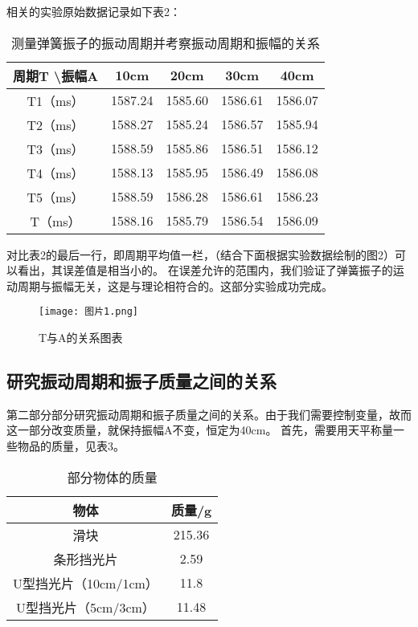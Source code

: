 \documentclass[11pt]{article}
\begin{document}
相关的实验原始数据记录如下表2：

\begin{table}[htbp]
    \centering
    \begin{tabular}{|c|c|c|c|c|}
    \hline
    周期T \textbackslash 振幅A & 10cm    & 20cm    & 30cm    & 40cm    \\ \hline
    T1（ms）                 & 1587.24 & 1585.60 & 1586.61 & 1586.07 \\ \hline
    T2（ms）                 & 1588.27 & 1585.24 & 1586.57 & 1585.94 \\ \hline
    T3（ms）                 & 1588.59 & 1585.86 & 1586.51 & 1586.12 \\ \hline
    T4（ms）                 & 1588.13 & 1585.95 & 1586.49 & 1586.08 \\ \hline
    T5（ms）                 & 1588.59 & 1586.28 & 1586.61 & 1586.23 \\ \hline
    T（ms）                  & 1588.16 & 1585.79 & 1586.54 & 1586.09 \\ \hline
    \end{tabular} 
    \caption{测量弹簧振子的振动周期并考察振动周期和振幅的关系}
\end{table}
   
    
对比表2的最后一行，即周期平均值一栏，（结合下面根据实验数据绘制的图2）可以看出，其误差值是相当小的。
在误差允许的范围内，我们验证了弹簧振子的运动周期与振幅无关，这是与理论相符合的。这部分实验成功完成。

\begin{figure}[htbp]
        \centering
        \texttt{[image: 图片1.png]}
        \caption{T与A的关系图表}
\end{figure}

\newpage
\subsection{研究振动周期和振子质量之间的关系}

第二部分部分研究振动周期和振子质量之间的关系。由于我们需要控制变量，故而这一部分改变质量，就保持振幅A不变，恒定为40cm。
首先，需要用天平称量一些物品的质量，见表3。


\begin{table}[htbp]
    \centering
    \begin{tabular}{|c|c|}
    \hline
    物体              & 质量/g   \\ \hline
    滑块              & 215.36 \\ \hline
    条形挡光片           & 2.59   \\ \hline
    U型挡光片（10cm/1cm） & 11.8   \\ \hline
    U型挡光片（5cm/3cm）  & 11.48  \\ \hline
\end{tabular} 
\caption{部分物体的质量}
\end{table}
\end{document}
